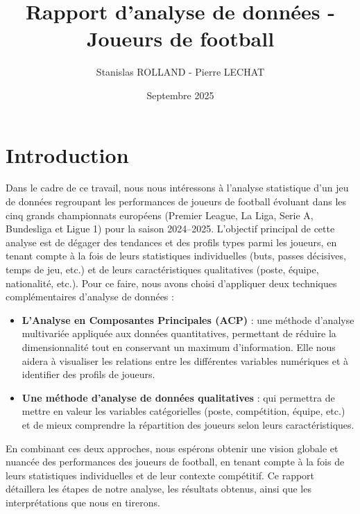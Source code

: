 \documentclass[11pt]{scrartcl}
\title{Rapport d'analyse de données - Joueurs de football}
\author{Stanislas ROLLAND - Pierre LECHAT}
\date{Septembre 2025}
\begin{document}
    \maketitle
    \tableofcontents  
    \newpage
 


    \section{Introduction}

    Dans le cadre de ce travail, nous nous intéressons à l’analyse statistique d’un jeu de données regroupant les performances de joueurs de football évoluant dans les cinq grands championnats européens (Premier League, La Liga, Serie A, Bundesliga et Ligue 1) pour la saison 2024--2025. 
    L’objectif principal de cette analyse est de dégager des tendances et des profils types parmi les joueurs, en tenant compte à la fois de leurs statistiques individuelles (buts, passes décisives, temps de jeu, etc.) et de leurs caractéristiques qualitatives (poste, équipe, nationalité, etc.). Pour ce faire, nous avons choisi d’appliquer deux techniques complémentaires d’analyse de données :
    \begin{itemize}

        \item \textbf{L’Analyse en Composantes Principales (ACP)} : une méthode d’analyse multivariée appliquée aux données quantitatives, permettant de réduire la dimensionnalité tout en conservant un maximum d’information. Elle nous aidera à visualiser les relations entre les différentes variables numériques et à identifier des profils de joueurs.  
        \item \textbf{Une méthode d’analyse de données qualitatives} : qui permettra de mettre en valeur les variables catégorielles (poste, compétition, équipe, etc.) et de mieux comprendre la répartition des joueurs selon leurs caractéristiques.  
    
    \end{itemize}
    En combinant ces deux approches, nous espérons obtenir une vision globale et nuancée des performances des joueurs de football, en tenant compte à la fois de leurs statistiques individuelles et de leur contexte compétitif. Ce rapport détaillera les étapes de notre analyse, les résultats obtenus, ainsi que les interprétations que nous en tirerons.
\end{document}
